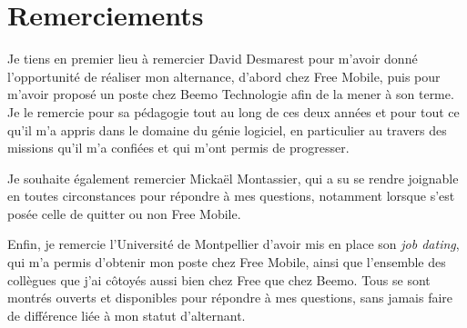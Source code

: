 \chapter*{Remerciements}

Je tiens en premier lieu à remercier David Desmarest pour m'avoir donné
l'opportunité de réaliser mon alternance, d'abord chez Free Mobile, puis pour
m'avoir proposé un poste chez Beemo Technologie afin de la mener à son terme.
Je le remercie pour sa pédagogie tout au long de ces deux années et pour tout
ce qu'il m'a appris dans le domaine du génie logiciel, en particulier au travers
des missions qu'il m'a confiées et qui m'ont permis de progresser.

Je souhaite également remercier Mickaël Montassier, qui a su se rendre joignable
en toutes circonstances pour répondre à mes questions, notamment lorsque s'est
posée celle de quitter ou non Free Mobile.

Enfin, je remercie l'Université de Montpellier d'avoir mis en place son
\emph{job dating}, qui m'a permis d'obtenir mon poste chez Free Mobile, ainsi
que l'ensemble des collègues que j'ai côtoyés aussi bien chez Free que chez
Beemo. Tous se sont montrés ouverts et disponibles pour répondre à mes
questions, sans jamais faire de différence liée à mon statut d'alternant.
